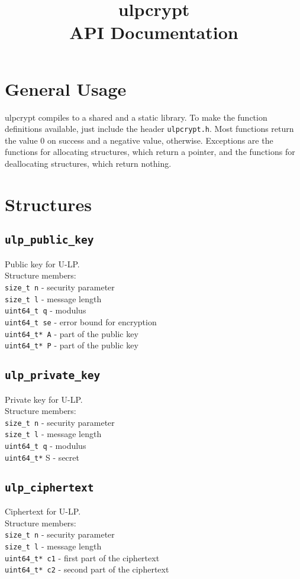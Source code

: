 \documentclass[10pt,a4paper]{article}
\title{\Huge{ulpcrypt}\\\large{API Documentation}}
\author{}
\date{}
\begin{document}
\maketitle

\section*{General Usage}

ulpcrypt compiles to a shared and a static library. To make the function definitions available, just include the header \texttt{ulpcrypt.h}. Most functions return the value 0 on success and a negative value, otherwise. Exceptions are the functions for allocating structures, which return a pointer, and the functions for deallocating structures, which return nothing.

\section*{Structures}

\subsection*{\texttt{ulp\_public\_key}}
Public key for U-LP.\\
Structure members:\\
\texttt{size\_t n} - security parameter\\
\texttt{size\_t l} - message length\\
\texttt{uint64\_t q} - modulus\\
\texttt{uint64\_t se} - error bound for encryption\\
\texttt{uint64\_t* A} - part of the public key\\
\texttt{uint64\_t* P} - part of the public key

\subsection*{\texttt{ulp\_private\_key}}
Private key for U-LP.\\
Structure members:\\
\texttt{size\_t n} - security parameter\\
\texttt{size\_t l} - message length\\
\texttt{uint64\_t q} - modulus\\
\texttt{uint64\_t*} S - secret

\subsection*{\texttt{ulp\_ciphertext}}
Ciphertext for U-LP.\\
Structure members:\\
\texttt{size\_t n} - security parameter\\
\texttt{size\_t l} - message length\\
\texttt{uint64\_t* c1} - first part of the ciphertext\\
\texttt{uint64\_t* c2} - second part of the ciphertext
\end{document}
